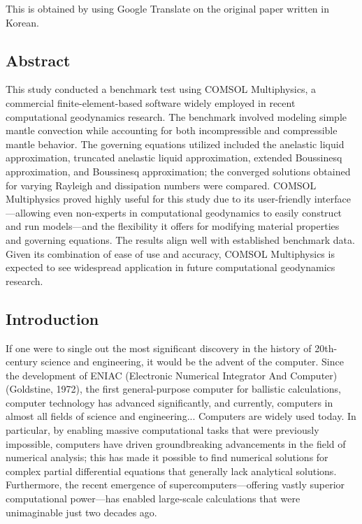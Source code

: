 This is obtained by using Google Translate on the original paper written in Korean.


\subsection*{Abstract}

This study conducted a benchmark test using COMSOL Multiphysics, a commercial finite-element-based software widely employed in recent computational geodynamics research. The benchmark involved modeling simple mantle convection while accounting for both incompressible and compressible mantle behavior. The governing equations utilized included the anelastic liquid approximation, truncated anelastic liquid approximation, extended Boussinesq approximation, and Boussinesq approximation; the converged solutions obtained for varying Rayleigh and dissipation numbers were compared. COMSOL Multiphysics proved highly useful for this study due to its user-friendly interface—allowing even non-experts in computational geodynamics to easily construct and run models—and the flexibility it offers for modifying material properties and governing equations. The results align well with established benchmark data. Given its combination of ease of use and accuracy, COMSOL Multiphysics is expected to see widespread application in future computational geodynamics research.


\subsection{Introduction}

If one were to single out the most significant discovery in the history of 20th-century science and engineering, it would be the advent of the computer. 
Since the development of ENIAC (Electronic Numerical Integrator And Computer) (Goldstine, 1972), the first general-purpose computer for ballistic calculations, computer technology has advanced significantly, and currently, computers in almost all fields of science and engineering...
Computers are widely used today. In particular, by enabling massive computational tasks that were previously impossible, computers have driven groundbreaking advancements in the field of numerical analysis; this has made it possible to find numerical solutions for complex partial differential equations that generally lack analytical solutions. Furthermore, the recent emergence of supercomputers—offering vastly superior computational power—has enabled large-scale calculations that were unimaginable just two decades ago.

